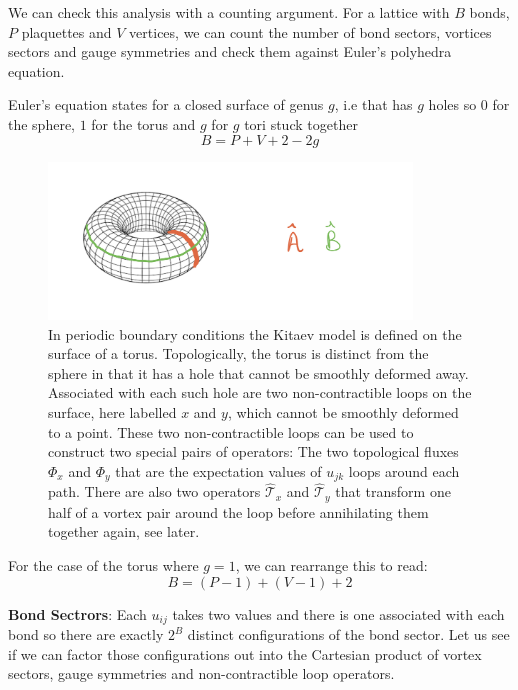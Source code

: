 We can check this analysis with a counting argument. For a lattice with \(B\) bonds, \(P\) plaquettes and \(V\) vertices, we can count the number of bond sectors, vortices sectors and gauge symmetries and check them against Euler's polyhedra equation.

Euler's equation states for a closed surface of genus \(g\), i.e that has \(g\) holes so \(0\) for the sphere, \(1\) for the torus and \(g\) for \(g\) tori stuck together \[B = P + V + 2 - 2g\]

\begin{figure}
\hypertarget{fig:torus}{%
\centering
\includegraphics[width=0.86\textwidth,height=\textheight]{figure_code/amk_chapter/torus.jpeg}
\caption{In periodic boundary conditions the Kitaev model is defined on the surface of a torus. Topologically, the torus is distinct from the sphere in that it has a hole that cannot be smoothly deformed away. Associated with each such hole are two non-contractible loops on the surface, here labelled \(x\) and \(y\), which cannot be smoothly deformed to a point. These two non-contractible loops can be used to construct two special pairs of operators: The two topological fluxes \(\Phi_x\) and \(\Phi_y\) that are the expectation values of \(u_{jk}\) loops around each path. There are also two operators \(\hat{\mathcal{T}}_x\) and \(\hat{\mathcal{T}}_y\) that transform one half of a vortex pair around the loop before annihilating them together again, see later.}\label{fig:torus}
}
\end{figure}

For the case of the torus where \(g = 1\), we can rearrange this to read: \[B = (P-1) + (V-1) + 2\]

\textbf{Bond Sectrors}: Each \(u_{ij}\) takes two values and there is one associated with each bond so there are exactly \(2^B\) distinct configurations of the bond sector. Let us see if we can factor those configurations out into the Cartesian product of vortex sectors, gauge symmetries and non-contractible loop operators.

